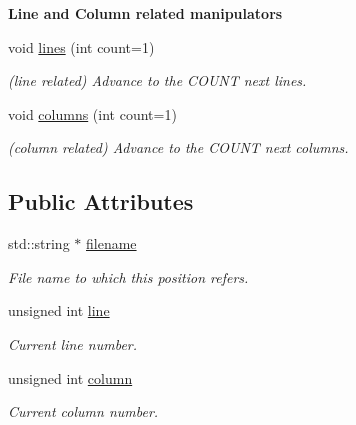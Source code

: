 \begin{Indent}{\bf Line and Column related manipulators}\par
\begin{DoxyCompactItemize}
\item 
\hypertarget{classyy_1_1position_a4fbdd03b4e09fa8755d79d3e675d6d3a}{void \hyperlink{classyy_1_1position_a4fbdd03b4e09fa8755d79d3e675d6d3a}{lines} (int count=1)}\label{classyy_1_1position_a4fbdd03b4e09fa8755d79d3e675d6d3a}

\begin{DoxyCompactList}\small\item\em (line related) Advance to the C\-O\-U\-N\-T next lines. \end{DoxyCompactList}\item 
\hypertarget{classyy_1_1position_ab15e0388c4fd433aa19c2435e49f72e9}{void \hyperlink{classyy_1_1position_ab15e0388c4fd433aa19c2435e49f72e9}{columns} (int count=1)}\label{classyy_1_1position_ab15e0388c4fd433aa19c2435e49f72e9}

\begin{DoxyCompactList}\small\item\em (column related) Advance to the C\-O\-U\-N\-T next columns. \end{DoxyCompactList}\end{DoxyCompactItemize}
\end{Indent}
\subsection*{Public Attributes}
\begin{DoxyCompactItemize}
\item 
\hypertarget{classyy_1_1position_a88d2d070ec4751e5d5b1999bb2dc2116}{std\-::string $\ast$ \hyperlink{classyy_1_1position_a88d2d070ec4751e5d5b1999bb2dc2116}{filename}}\label{classyy_1_1position_a88d2d070ec4751e5d5b1999bb2dc2116}

\begin{DoxyCompactList}\small\item\em File name to which this position refers. \end{DoxyCompactList}\item 
\hypertarget{classyy_1_1position_aa3806654fd62786a0446a461d55755d6}{unsigned int \hyperlink{classyy_1_1position_aa3806654fd62786a0446a461d55755d6}{line}}\label{classyy_1_1position_aa3806654fd62786a0446a461d55755d6}

\begin{DoxyCompactList}\small\item\em Current line number. \end{DoxyCompactList}\item 
\hypertarget{classyy_1_1position_ada60c2dbba2e05705265f8359f722c4f}{unsigned int \hyperlink{classyy_1_1position_ada60c2dbba2e05705265f8359f722c4f}{column}}\label{classyy_1_1position_ada60c2dbba2e05705265f8359f722c4f}

\begin{DoxyCompactList}\small\item\em Current column number. \end{DoxyCompactList}\end{DoxyCompactItemize}


